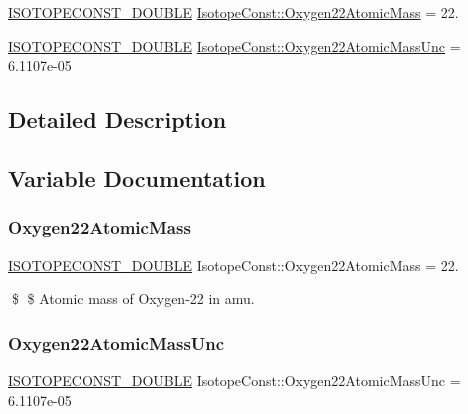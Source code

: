 \begin{DoxyCompactItemize}
\item 
\mbox{\hyperlink{group___isotope_const-_macros_ga8f45a7272ce02c0b4c65c44636ed719a}{I\+S\+O\+T\+O\+P\+E\+C\+O\+N\+S\+T\+\_\+\+D\+O\+U\+B\+LE}} \mbox{\hyperlink{group___isotope_const-_oxygen-_o22_ga6d71c62998d90fec5a0f75b8407f906c}{Isotope\+Const\+::\+Oxygen22\+Atomic\+Mass}} = 22.
\item 
\mbox{\hyperlink{group___isotope_const-_macros_ga8f45a7272ce02c0b4c65c44636ed719a}{I\+S\+O\+T\+O\+P\+E\+C\+O\+N\+S\+T\+\_\+\+D\+O\+U\+B\+LE}} \mbox{\hyperlink{group___isotope_const-_oxygen-_o22_gad2dcba509bd788b5ec6a8d624f237e8e}{Isotope\+Const\+::\+Oxygen22\+Atomic\+Mass\+Unc}} = 6.\+1107e-\/05
\end{DoxyCompactItemize}


\subsection{Detailed Description}


\subsection{Variable Documentation}
\mbox{\label{group___isotope_const-_oxygen-_o22_ga6d71c62998d90fec5a0f75b8407f906c}} 
\subsubsection{\texorpdfstring{Oxygen22\+Atomic\+Mass}{Oxygen22AtomicMass}}
{\footnotesize\ttfamily \mbox{\hyperlink{group___isotope_const-_macros_ga8f45a7272ce02c0b4c65c44636ed719a}{I\+S\+O\+T\+O\+P\+E\+C\+O\+N\+S\+T\+\_\+\+D\+O\+U\+B\+LE}} Isotope\+Const\+::\+Oxygen22\+Atomic\+Mass = 22.}

\$ \$ Atomic mass of Oxygen-\/22 in amu. \mbox{\label{group___isotope_const-_oxygen-_o22_gad2dcba509bd788b5ec6a8d624f237e8e}} 
\subsubsection{\texorpdfstring{Oxygen22\+Atomic\+Mass\+Unc}{Oxygen22AtomicMassUnc}}
{\footnotesize\ttfamily \mbox{\hyperlink{group___isotope_const-_macros_ga8f45a7272ce02c0b4c65c44636ed719a}{I\+S\+O\+T\+O\+P\+E\+C\+O\+N\+S\+T\+\_\+\+D\+O\+U\+B\+LE}} Isotope\+Const\+::\+Oxygen22\+Atomic\+Mass\+Unc = 6.\+1107e-\/05}

